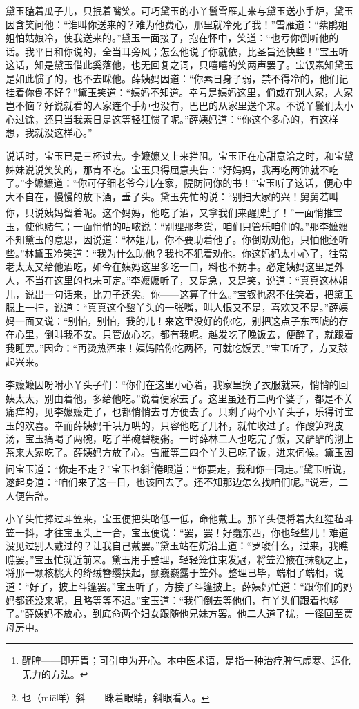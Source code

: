 \par 黛玉磕着瓜子儿，只抿着嘴笑。可巧黛玉的小丫鬟雪雁走来与黛玉送小手炉，黛玉因含笑问他：“谁叫你送来的？难为他费心，那里就冷死了我！”雪雁道：“紫鹃姐姐怕姑娘冷，使我送来的。”黛玉一面接了，抱在怀中，笑道：“也亏你倒听他的话。我平日和你说的，全当耳旁风；怎么他说了你就依，比圣旨还快些！”宝玉听这话，知是黛玉借此奚落他，也无回复之词，只嘻嘻的笑两声罢了。宝钗素知黛玉是如此惯了的，也不去睬他。薛姨妈因道：“你素日身子弱，禁不得冷的，他们记挂着你倒不好？”黛玉笑道：“姨妈不知道。幸亏是姨妈这里，倘或在别人家，人家岂不恼？好说就看的人家连个手炉也没有，巴巴的从家里送个来。不说丫鬟们太小心过馀，还只当我素日是这等轻狂惯了呢。”薛姨妈道：“你这个多心的，有这样想，我就没这样心。”
\par 说话时，宝玉已是三杯过去。李嬷嬷又上来拦阻。宝玉正在心甜意洽之时，和宝黛姊妹说说笑笑的，那肯不吃。宝玉只得屈意央告：“好妈妈，我再吃两钟就不吃了。”李嬷嬷道：“你可仔细老爷今儿在家，隄防问你的书！”宝玉听了这话，便心中大不自在，慢慢的放下酒，垂了头。黛玉先忙的说：“别扫大家的兴！舅舅若叫你，只说姨妈留着呢。这个妈妈，他吃了酒，又拿我们来醒脾\footnote{醒脾——即开胃；可引申为开心。本中医术语，是指一种治疗脾气虚寒、运化无力的方法。}了！”一面悄推宝玉，使他赌气；一面悄悄的咕哝说：“别理那老货，咱们只管乐咱们的。”那李嬷嬷不知黛玉的意思，因说道：“林姐儿，你不要助着他了。你倒劝劝他，只怕他还听些。”林黛玉冷笑道：“我为什么助他？我也不犯着劝他。你这妈妈太小心了，往常老太太又给他酒吃，如今在姨妈这里多吃一口，料也不妨事。必定姨妈这里是外人，不当在这里的也未可定。”李嬷嬷听了，又是急，又是笑，说道：“真真这林姐儿，说出一句话来，比刀子还尖。你——这算了什么。”宝钗也忍不住笑着，把黛玉腮上一拧，说道：“真真这个颦丫头的一张嘴，叫人恨又不是，喜欢又不是。”薛姨妈一面又说：“别怕，别怕，我的儿！来这里没好的你吃，别把这点子东西唬的存在心里，倒叫我不安。只管放心吃，都有我呢。越发吃了晚饭去，便醉了，就跟着我睡罢。”因命：“再烫热酒来！姨妈陪你吃两杯，可就吃饭罢。”宝玉听了，方又鼓起兴来。
\par 李嬷嬷因吩咐小丫头子们：“你们在这里小心着，我家里换了衣服就来，悄悄的回姨太太，别由着他，多给他吃。”说着便家去了。这里虽还有三两个婆子，都是不关痛痒的，见李嬷嬷走了，也都悄悄去寻方便去了。只剩了两个小丫头子，乐得讨宝玉的欢喜。幸而薛姨妈千哄万哄的，只容他吃了几杯，就忙收过了。作酸笋鸡皮汤，宝玉痛喝了两碗，吃了半碗碧粳粥。一时薛林二人也吃完了饭，又酽酽的沏上茶来大家吃了。薛姨妈方放了心。雪雁等三四个丫头已吃了饭，进来伺候。黛玉因问宝玉道：“你走不走？”宝玉乜斜\footnote{乜（miē咩）斜——眯着眼睛，斜眼看人。}倦眼道：“你要走，我和你一同走。”黛玉听说，遂起身道：“咱们来了这一日，也该回去了。还不知那边怎么找咱们呢。”说着，二人便告辞。
\par 小丫头忙捧过斗笠来，宝玉便把头略低一低，命他戴上。那丫头便将着大红猩毡斗笠一抖，才往宝玉头上一合，宝玉便说：“罢，罢！好蠢东西，你也轻些儿！难道没见过别人戴过的？让我自己戴罢。”黛玉站在炕沿上道：“罗唆什么，过来，我瞧瞧罢。”宝玉忙就近前来。黛玉用手整理，轻轻笼住束发冠，将笠沿掖在抹额之上，将那一颗核桃大的绛绒簪缨扶起，颤巍巍露于笠外。整理已毕，端相了端相，说道：“好了，披上斗篷罢。”宝玉听了，方接了斗篷披上。薛姨妈忙道：“跟你们的妈妈都还没来呢，且略等等不迟。”宝玉道：“我们倒去等他们，有丫头们跟着也够了。”薛姨妈不放心，到底命两个妇女跟随他兄妹方罢。他二人道了扰，一径回至贾母房中。

